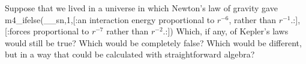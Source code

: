Suppose that we lived in a universe in which Newton's
law of gravity gave m4_ifelse(__sn,1,[:an interaction energy proportional to $r^{-6}$, rather than $r^{-1}$.:],[:forces proportional to $r^{-7}$ rather than $r^{-2}$.:])
Which, if any, of Kepler's laws would still be true?
Which would be completely false? Which would be different,
but in a way that could be calculated with straightforward
algebra?
